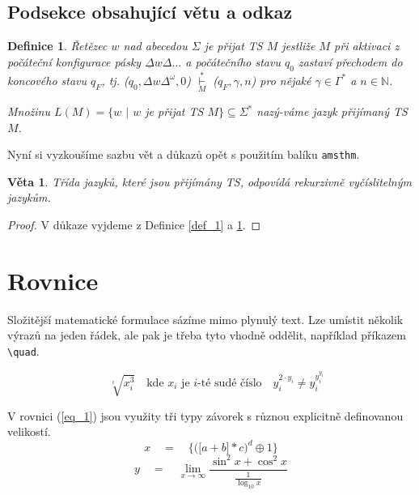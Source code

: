 \documentclass[11pt, twocolumn]{article}
\newtheorem{theorem}{Definice}
\newtheorem{sentence}{Věta}
\begin{document}
\subsection{Podsekce obsahující větu a odkaz}
\begin{theorem}
\label{def_2}
\emph{Řetězec \(w\) nad abecedou \(\Sigma\) je přijat TS \emph{\(M\)
jestliže \(M\) při aktivaci z počáteční konfigurace pásky}
\(\underline{\Delta}w\Delta...\)\emph{ a počátečního stavu \(q_0\) zastaví přechodem do koncového stavu \(q_F\), tj. (\(q_0, \Delta w\Delta^{\omega},0\)) \(\mathop{\vdash}\limits^{*}_{M}\) (\(q_F,\gamma,n\)) pro nějaké \(\gamma \in \Gamma^{*}\) a \(n \in \mathbb{N}\).}}

Množinu \(L(M) = \{w \) \(|\) \(w\) je přijat TS \(M\}\subseteq\Sigma^{*}\) nazý-\break váme jazyk přijímaný TS \(M\).
\end{theorem}
Nyní si vyzkoušíme sazbu vět a důkazů opět s použitím balíku \verb|amsthm|.
\begin{sentence}
Třída jazyků, které jsou přijímány TS, odpovídá \emph{rekurzivně vyčíslitelným jazykům.}
\end{sentence}
\begin{proof}
V důkaze vyjdeme z Definice \ref{def_1} a \ref{def_2}.
\end{proof}
\section{Rovnice}
\noindent Složitější matematické formulace sázíme mimo plynulý text. Lze umístit několik výrazů na jeden řádek, ale pak je třeba tyto vhodně oddělit, například příkazem \verb|\quad|.

\[\quad \sqrt[i]{x^3_i}\quad\text{kde }x_{i}\text{ je } i\text{-té sudé číslo}\quad y_{i}^{2\cdot y_{i}} \neq y_{i}^{y_{i}^{y_{i}}}\]

V rovnici (\ref{eq_1}) jsou využity tři typy závorek s různou
explicitně definovanou velikostí.
\begin{equation}
\label{eq_1}
x \quad = \quad \bigg\{\Big(\big[a+b\big]*c\Big)^{d}\oplus 1 \bigg\}
\end{equation}
\begin{equation}
\label{eq_2}
    y \quad=\quad \lim_{x\to\infty} \frac{\sin^2x+\cos^2x}{\frac{1}{\log_{10} x}}
\end{equation}
\end{document}
